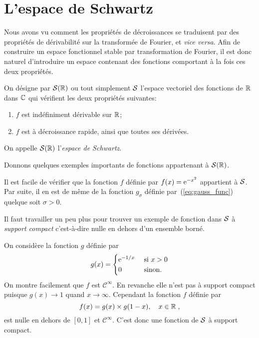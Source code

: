 
\section{L'espace de Schwartz}

Nous avons vu comment les propri{\'e}t{\'e}s de d{\'e}croissances se traduisent par des
propri{\'e}t{\'e}s de d{\'e}rivabilit{\'e} sur la transform{\'e}e de Fourier, et \textit{vice
  versa}.
Afin de construire un espace fonctionnel stable par transformation de Fourier,
il est donc naturel d'introduire un espace contenant des fonctions comportant
{\`a} la fois ces deux propri{\'e}t{\'e}s.

\begin{definition} On d{\'e}signe par $\mathcal{S}(\mathbb{R})$ ou tout simplement $\mathcal{S}$
l'espace vectoriel des fonctions de $\mathbb{R}$ dans $\mathbb{C}$ qui v{\'e}rifient les deux propri{\'e}t{\'e}s suivantes:
\begin{enumerate}
\item $f$ est ind{\'e}finiment d{\'e}rivable sur $\mathbb{R}$;
\item $f$ est {\`a} d{\'e}croissance rapide, ainsi que toutes ses d{\'e}riv{\'e}es.
\end{enumerate}
On appelle $\mathcal{S}(\mathbb{R})$ l'\emph{espace de Schwartz}.
\end{definition}

Donnons quelques exemples importants de fonctions appartenant {\`a} $\mathcal{S}(\mathbb{R})$.
\begin{example}
  Il est facile de v{\'e}rifier que la fonction $f$ d{\'e}finie par $f(x)=\mathrm{e}^{-x^2}$
  appartient {\`a} $\mathcal{S}$. Par suite, il en est de m{\^e}me de la fonction $g_\sigma$
  d{\'e}finie par~(\ref{eq:gauss_func}) quelque soit $\sigma>0$.
\end{example}
Il faut travailler un peu plus pour trouver un exemple de fonction dans $\mathcal{S}$
{\`a} \emph{support compact} c'est-{\`a}-dire nulle en dehors d'un ensemble
born{\'e}.
\begin{example}\label{exple:cinfty-supp-compact}
  On consid{\`e}re la fonction $g$ d{\'e}finie par
$$
g(x)=
\begin{cases}
\mathrm{e}^{-1/x} &\text{ si $x>0$}\\
0 &\text{ sinon.}
\end{cases}
$$
On montre facilement que $f$ est
$\mathcal{C}^\infty$. En revanche elle n'est pas {\`a} support compact puisque
$g(x)\to1$ quand $x\to\infty$. Cependant la fonction $f$ d{\'e}finie par
$$
f(x)=g(x) \times g(1-x) ,\quad x\in\mathbb{R}\;,
$$
est nulle en dehors de $[0,1]$ et $\mathcal{C}^\infty$. C'est donc une fonction
de $\mathcal{S}$ {\`a} support compact.
\end{example}

